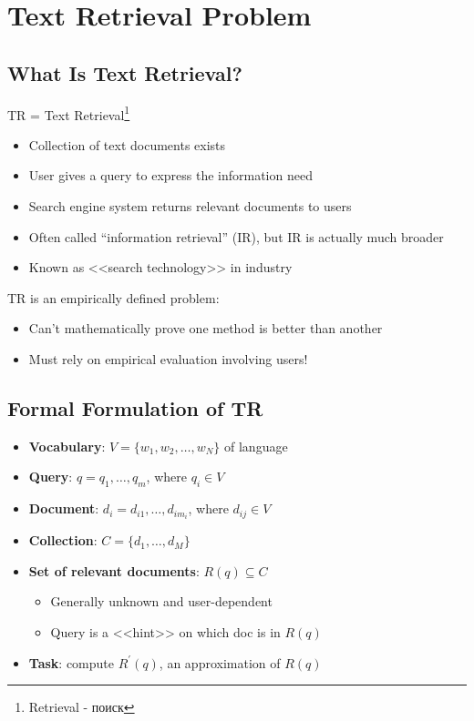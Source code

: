 \section{Text Retrieval Problem}

\subsection{What Is Text Retrieval?}
TR = Text Retrieval\footnote{Retrieval - поиск}

\begin{itemize}
\item Collection of text documents exists
\item User gives a query to express the information need
\item Search engine system returns relevant documents to users
\item Often called “information retrieval” (IR), but IR is actually much broader
\item Known as <<search technology>> in industry
\end{itemize}

TR is an empirically defined problem:
\begin{itemize}
\item Can’t mathematically prove one method is better than another
\item Must rely on empirical evaluation involving users!
\end{itemize}



\subsection{Formal Formulation of TR}
\begin{itemize}
\item \textbf{Vocabulary}: $V=\{w_1, w_2, \dots , w_N\}$ of language
\item \textbf{Query}: $q = q_1,\dots ,q_m$, where $q_i \in V$
\item \textbf{Document}: $d_i=d_{i1},\dots ,d_{im_i}$, where $d_{ij} \in V$
\item \textbf{Collection}: $C=\{d_1,\dots , d_M\}$
\item \textbf{Set of relevant documents}: $R(q) \subseteq C$
    \begin{itemize}
    \item Generally unknown and user-dependent 
    \item Query is a <<hint>> on which doc is in $R(q)$
    \end{itemize}    
\item \textbf{Task}: compute $R^\prime(q)$, an approximation of $R(q)$
\end{itemize}


